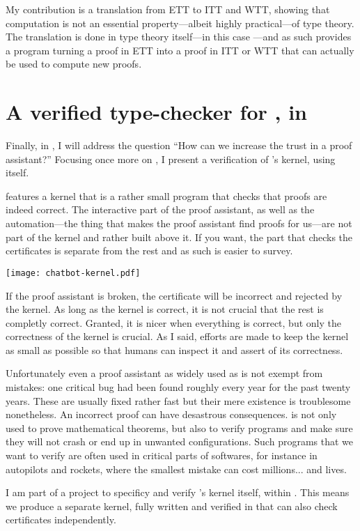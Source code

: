 My contribution is a translation from \acrshort{ETT} to \acrshort{ITT} and
\acrshort{WTT}, showing that computation is not an essential property---albeit
highly practical---of type theory. The translation is done in type theory
itself---in this case \Coq---and as such provides a program turning a proof in
\acrshort{ETT} into a proof in \acrshort{ITT} or \acrshort{WTT} that can
actually be used to compute new proofs.

\section{A verified type-checker for \Coq, in \Coq}

Finally, in , I will address the question ``How can we
increase the trust in a proof assistant?'' Focusing once more on \Coq, I present
a verification of \Coq's kernel, using \Coq itself.

\Coq features a kernel that is a rather small program that checks that proofs
are indeed correct. The interactive part of the proof assistant, as well as the
automation---\ie the thing that makes the proof assistant find proofs for
us---are not part of the kernel and rather built above it.
If you want, the part that checks the certificates is separate from the rest
and as such is easier to survey.

\begin{center}
  \texttt{[image: chatbot-kernel.pdf]}
\end{center}

If the proof assistant is broken, the certificate will be incorrect and rejected
by the kernel. As long as the kernel is correct, it is not crucial that the rest
is completly correct. Granted, it is nicer when everything is correct, but only
the correctness of the kernel is crucial.
As I said, efforts are made to keep the kernel as small as possible so that
humans can inspect it and assert of its correctness.

Unfortunately even a proof assistant as widely used as \Coq is not exempt from
mistakes: one critical bug had been found roughly every year for the past twenty
years. These are usually fixed rather fast but their mere existence is
troublesome nonetheless.
An incorrect proof can have desastrous consequences. \Coq is not only used to
prove mathematical theorems, but also to verify programs and make sure they will
not crash or end up in unwanted configurations. Such programs that we want to
verify are often used in critical parts of softwares, for instance in autopilots
and rockets, where the smallest mistake can cost millions... and lives.

I am part of a project to specificy and verify \Coq's kernel itself, within
\Coq. This means we produce a separate kernel, fully written and verified in
\Coq that can also check certificates independently.